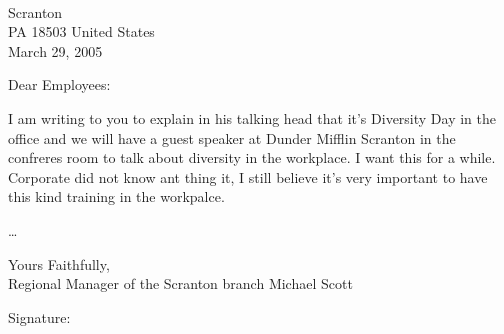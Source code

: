 \documentclass[12pt]{letter}
\date{} %
\begin{document}
\begin{letter}{
\\ Scranton \\ PA 18503 United States\\ March 29, 2005}
\opening{Dear Employees:}

I am writing to you to explain in his talking head that it's Diversity Day in the office and we will have a guest speaker at Dunder Mifflin Scranton in the confreres room to talk about diversity in the workplace. 
I want this for a while. Corporate did not know ant thing it, I still believe it's very important to have this kind training in the workpalce.

\ldots 



\closing{Yours Faithfully, \\ Regional Manager of the Scranton branch Michael Scott}

Signature:

\end{letter}
\end{document}
